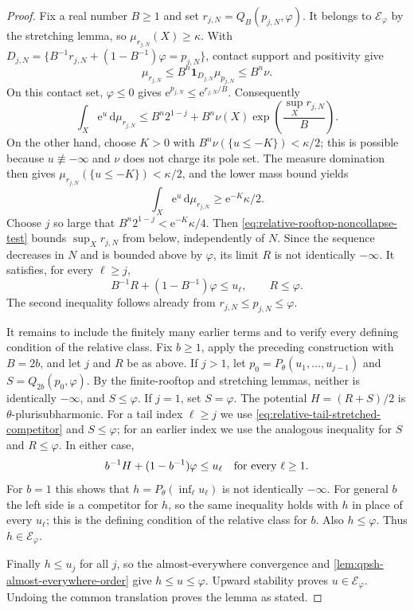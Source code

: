 \begin{proof}
Fix a real number $B\geq1$ and set $r_{j,N}=Q_B(p_{j,N},\varphi)$. It belongs to $\mathcal E_\varphi$ by the stretching lemma, so $\mu_{r_{j,N}}(X)\geq\kappa$. With $D_{j,N}=\{B^{-1}r_{j,N}+(1-B^{-1})\varphi=p_{j,N}\}$, contact support and positivity give
\[
 \mu_{r_{j,N}}\leq B^n\mathbf1_{D_{j,N}}\mu_{p_{j,N}}
 \leq B^n\nu.
\]
On this contact set, $\varphi\leq0$ gives
$\mathrm{e}^{p_{j,N}}\leq \mathrm{e}^{r_{j,N}/B}$. Consequently
\begin{equation}\label{eq:relative-rooftop-noncollapse-test}
 \int_X\mathrm{e}^u\,\mathrm{d}\mu_{r_{j,N}}
 \leq B^n2^{1-j}
      +B^n\nu(X)\exp\!\left(\frac{\sup_X r_{j,N}}B\right).
\end{equation}
On the other hand, choose $K>0$ with $B^n\nu(\{u\leq-K\})<\kappa/2$; this is possible because $u\not\equiv-\infty$ and $\nu$ does not charge its pole set. The measure domination then gives $\mu_{r_{j,N}}(\{u\leq-K\})<\kappa/2$, and the lower mass bound yields
\[
 \int_X\mathrm{e}^u\,\mathrm{d}\mu_{r_{j,N}}\geq \mathrm{e}^{-K}\kappa/2.
\]
Choose $j$ so large that $B^n2^{1-j}<\mathrm{e}^{-K}\kappa/4$. Then \eqref{eq:relative-rooftop-noncollapse-test} bounds $\sup_Xr_{j,N}$ from below, independently of $N$. Since the sequence decreases in $N$ and is bounded above by $\varphi$, its limit $R$ is not identically $-\infty$. It satisfies, for every $\ell\geq j$,
\begin{equation}\label{eq:relative-tail-stretched-competitor}
 B^{-1}R+(1-B^{-1})\varphi\leq u_\ell,
 \qquad R\leq\varphi.
\end{equation}
The second inequality follows already from $r_{j,N}\leq p_{j,N}\leq\varphi$.

It remains to include the finitely many earlier terms and to verify every defining condition of the relative class. Fix $b\geq1$, apply the preceding construction with $B=2b$, and let $j$ and $R$ be as above. If $j>1$, let $p_0=P_\theta(u_1,\ldots,u_{j-1})$ and $S=Q_{2b}(p_0,\varphi)$. By the finite-rooftop and stretching lemmas, neither is identically $-\infty$, and $S\leq\varphi$. If $j=1$, set $S=\varphi$. The potential $H=(R+S)/2$ is $\theta$-plurisubharmonic. For a tail index $\ell\geq j$ we use \eqref{eq:relative-tail-stretched-competitor} and $S\leq\varphi$; for an earlier index we use the analogous inequality for $S$ and $R\leq\varphi$. In either case,
\[
 b^{-1}H+(1-b^{-1})\varphi\leq u_\ell
 \quad\hbox{for every }\ell\geq1.
\]
For $b=1$ this shows that $h=P_\theta(\inf_\ell u_\ell)$ is not identically $-\infty$. For general $b$ the left side is a competitor for $h$, so the same inequality holds with $h$ in place of every $u_\ell$; this is the defining condition of the relative class for $b$. Also $h\leq\varphi$. Thus $h\in\mathcal E_\varphi$.

Finally $h\leq u_j$ for all $j$, so the almost-everywhere convergence and \cref{lem:qpsh-almost-everywhere-order} give $h\leq u\leq\varphi$. Upward stability proves $u\in\mathcal E_\varphi$. Undoing the common translation proves the lemma as stated.
\end{proof}

